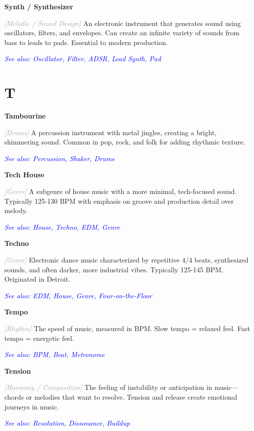 \documentclass[11pt,letterpaper]{article}
\newcommand{\term}[1]{\textbf{\large\color{purple}#1}}
\newcommand{\category}[1]{\textcolor{darkgray}{\textit{\small [#1]}}}
\newcommand{\seealso}[1]{\textcolor{blue}{\textit{See also: #1}}}
\newenvironment{termdef}[1]
  {\noindent\term{#1}\par\nopagebreak}
  {\par\vspace{0.3em}}
\begin{document}
\begin{termdef}{Synth / Synthesizer}
\category{Melodic / Sound Design}
An electronic instrument that generates sound using oscillators, filters, and envelopes. Can create an infinite variety of sounds from bass to leads to pads. Essential to modern production.

\seealso{Oscillator, Filter, ADSR, Lead Synth, Pad}
\end{termdef}

\newpage

\section*{T}

\begin{termdef}{Tambourine}
\category{Drums}
A percussion instrument with metal jingles, creating a bright, shimmering sound. Common in pop, rock, and folk for adding rhythmic texture.

\seealso{Percussion, Shaker, Drums}
\end{termdef}

\begin{termdef}{Tech House}
\category{Genre}
A subgenre of house music with a more minimal, tech-focused sound. Typically 125-130 BPM with emphasis on groove and production detail over melody.

\seealso{House, Techno, EDM, Genre}
\end{termdef}

\begin{termdef}{Techno}
\category{Genre}
Electronic dance music characterized by repetitive 4/4 beats, synthesized sounds, and often darker, more industrial vibes. Typically 125-145 BPM. Originated in Detroit.

\seealso{EDM, House, Genre, Four-on-the-Floor}
\end{termdef}

\begin{termdef}{Tempo}
\category{Rhythm}
The speed of music, measured in BPM. Slow tempo = relaxed feel. Fast tempo = energetic feel.

\seealso{BPM, Beat, Metronome}
\end{termdef}

\begin{termdef}{Tension}
\category{Harmony / Composition}
The feeling of instability or anticipation in music—chords or melodies that want to resolve. Tension and release create emotional journeys in music.

\seealso{Resolution, Dissonance, Buildup}
\end{termdef}
\end{document}
